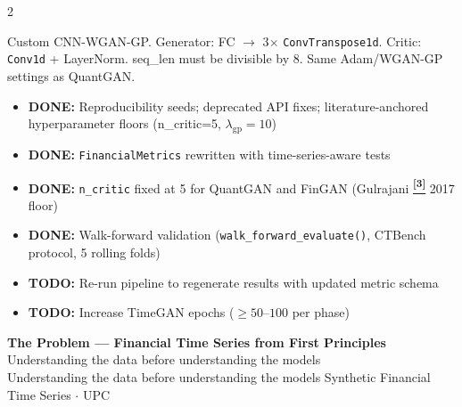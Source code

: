 \documentclass[10pt]{article}
\newcommand{\greenbox}[2]{\begin{tcolorbox}[mybox={FGreen}{GBg},title={#1}]#2\end{tcolorbox}}
\newcommand{\pagehead}[2]{%
  \begin{tcolorbox}[enhanced,arc=0pt,outer arc=0pt,boxrule=0pt,
    colback=Navy,colframe=Navy,
    top=5pt,bottom=5pt,left=8pt,right=8pt,
    before skip=0pt,after skip=10pt]
  {\color{white}\large\bfseries #1}%
  \ifx\relax#2\relax\else\\[1pt]{\color{blue!30!white}\small #2}\fi
  \hfill{\color{blue!20!white}\footnotesize Synthetic Financial Time Series $\cdot$ UPC}
  \end{tcolorbox}}
\newcommand{\tcite}[1]{%
  \hyperlink{R:#1}{\textsuperscript{\scriptsize\textbf{[#1]}}}}
\begin{document}
\begin{multicols}{2}
\begin{tcolorbox}[mybox={FGcol}{GBg},title={FinGAN}]
Custom CNN-WGAN-GP. Generator: FC $\to$ 3$\times$ \texttt{ConvTranspose1d}. Critic: \texttt{Conv1d} + LayerNorm. seq\_len must be divisible by 8. Same Adam/WGAN-GP settings as QuantGAN.
\end{tcolorbox}

\greenbox{Pipeline Status}{%
\begin{itemize}
  \item \textbf{DONE:} Reproducibility seeds; deprecated API fixes; literature-anchored hyperparameter floors (n\_critic=5, $\lambda_\text{gp}=10$)
  \item \textbf{DONE:} \texttt{FinancialMetrics} rewritten with time-series-aware tests
  \item \textbf{DONE:} \texttt{n\_critic} fixed at 5 for QuantGAN and FinGAN (Gulrajani\tcite{3} 2017 floor)
  \item \textbf{DONE:} Walk-forward validation (\texttt{walk\_forward\_evaluate()}, CTBench protocol, 5 rolling folds)
  \item \textbf{TODO:} Re-run pipeline to regenerate results with updated metric schema
  \item \textbf{TODO:} Increase TimeGAN epochs ($\geq 50$--$100$ per phase)
\end{itemize}}

\end{multicols}

\clearpage

\pagehead{The Problem --- Financial Time Series from First Principles}
         {Understanding the data before understanding the models}
\end{document}
